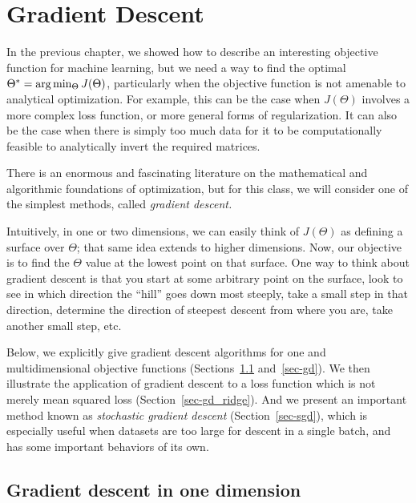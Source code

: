 \chapter{Gradient Descent}
\label{chap-gradient}
\vspace*{-0.1in}
In the previous chapter,
we showed how to describe an interesting objective function for
machine learning, but we need a way to
find the optimal $\Theta^* = {\rm arg}\min_{\Theta} J(\Theta)$, particularly
when the objective function is not amenable to analytical
optimization.  For example, this can be the case when $J(\Theta)$
involves a more complex loss function, or more general forms of
regularization.  It can also be the case when there is simply too much
data for it to be computationally feasible to analytically invert the
required matrices.

There is an
enormous and fascinating literature on the mathematical and algorithmic
foundations of optimization, but for this class, we will consider one of the simplest
methods, called {\em gradient descent.}

Intuitively, in one or two dimensions, we can easily think of
$J(\Theta)$ as defining a surface over $\Theta$;  that same idea
extends to higher dimensions.  Now, our objective is to find the
$\Theta$ value at the lowest point on that surface.  One way to think
about gradient descent is that you start at some arbitrary point on
the surface, look to see in which direction the ``hill'' goes down
most steeply, take a small step in that direction, determine the
direction of steepest descent from where you are, take another small
step, etc.

Below, we explicitly give gradient descent algorithms for one and
multidimensional objective functions (Sections~\ref{sec-gd_onedim}
and~\ref{sec-gd}).  We then illustrate the application of gradient
descent to a loss function which is not merely mean squared loss
(Section~\ref{sec-gd_ridge}).  And we present an important method known
as {\em stochastic gradient descent}
(Section~\ref{sec-sgd}), which is
especially useful when datasets are too large for descent in a single
batch, and has some important behaviors of its own.

\section{Gradient descent in one dimension}\label{sec-gd_onedim}

